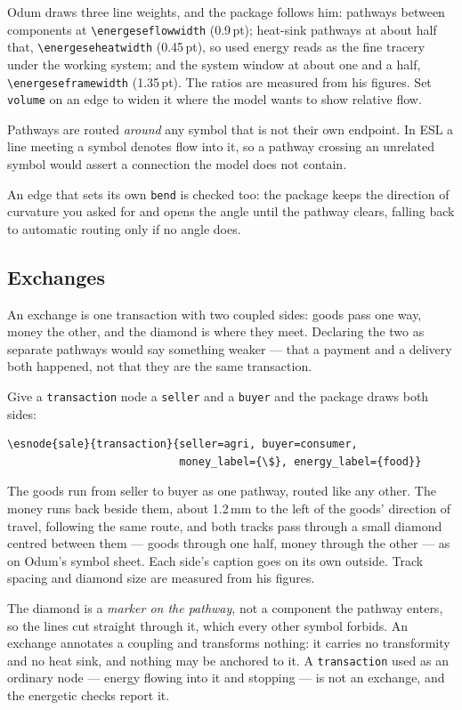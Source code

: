 \documentclass{article}
\begin{document}
Odum draws three line weights, and the package follows him: pathways between
components at \verb|\energeseflowwidth| (0.9\,pt); heat-sink pathways at about
half that, \verb|\energeseheatwidth| (0.45\,pt), so used energy reads as the
fine tracery under the working system; and the system window at about one and a
half, \verb|\energeseframewidth| (1.35\,pt). The ratios are measured from his
figures. Set \texttt{volume} on an edge to widen it where the model wants to
show relative flow.

Pathways are routed \emph{around} any symbol that is not their own endpoint. In
ESL a line meeting a symbol denotes flow into it, so a pathway crossing an
unrelated symbol would assert a connection the model does not contain.

An edge that sets its own \texttt{bend} is checked too: the package keeps the
direction of curvature you asked for and opens the angle until the pathway
clears, falling back to automatic routing only if no angle does.

\subsection{Exchanges}

An exchange is one transaction with two coupled sides: goods pass one way, money
the other, and the diamond is where they meet. Declaring the two as separate
pathways would say something weaker --- that a payment and a delivery both
happened, not that they are the same transaction.

Give a \texttt{transaction} node a \texttt{seller} and a \texttt{buyer} and the
package draws both sides:

\begin{verbatim}
\esnode{sale}{transaction}{seller=agri, buyer=consumer,
                           money_label={\$}, energy_label={food}}
\end{verbatim}

\noindent The goods run from seller to buyer as one pathway, routed like any
other. The money runs back beside them, about 1.2\,mm to the left of the goods'
direction of travel, following the same route, and both tracks pass through a
small diamond centred between them --- goods through one half, money through the
other --- as on Odum's symbol sheet. Each side's caption goes on its own
outside. Track spacing and diamond size are measured from his figures.

The diamond is a \emph{marker on the pathway}, not a component the pathway
enters, so the lines cut straight through it, which every other symbol forbids.
An exchange annotates a coupling and transforms nothing: it carries no
transformity and no heat sink, and nothing may be anchored to it. A
\texttt{transaction} used as an ordinary node --- energy flowing into it and
stopping --- is not an exchange, and the energetic checks report it.
\end{document}
